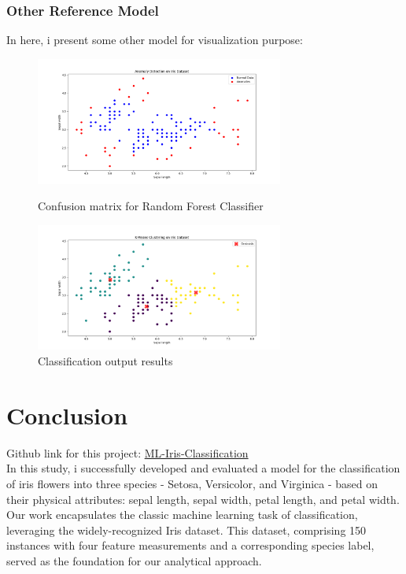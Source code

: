 \documentclass[a4paper]{article}
\begin{document}
\subsubsection{Other Reference Model}
In here, i present some other model for visualization purpose:
\begin{figure}[h]
	\begin{minipage}{0.32\textwidth}
		\centering
		\includegraphics[height=4.2cm]{picture/Anomaly} %
		\caption{Confusion matrix for Random Forest Classifier}
		\label{fig:setosa}
	\end{minipage}\hspace{3cm}
	\begin{minipage}{0.32\textwidth}
		\centering
		\includegraphics[height=4.2cm]{picture/k_mean} %
		\caption{Classification output results}
		\label{fig:versicolour}
	\end{minipage}\hfill
\end{figure}
\newpage
\section{Conclusion}
Github link for this project:
\href{https://github.com/illubaby/ML-Iris-Classification}{ML-Iris-Classification}\\
In this study, i successfully developed and evaluated a model for the classification of iris flowers into three species - Setosa, Versicolor, and Virginica - based on their physical attributes: sepal length, sepal width, petal length, and petal width. Our work encapsulates the classic machine learning task of classification, leveraging the widely-recognized Iris dataset. This dataset, comprising 150 instances with four feature measurements and a corresponding species label, served as the foundation for our analytical approach.
\end{document}
